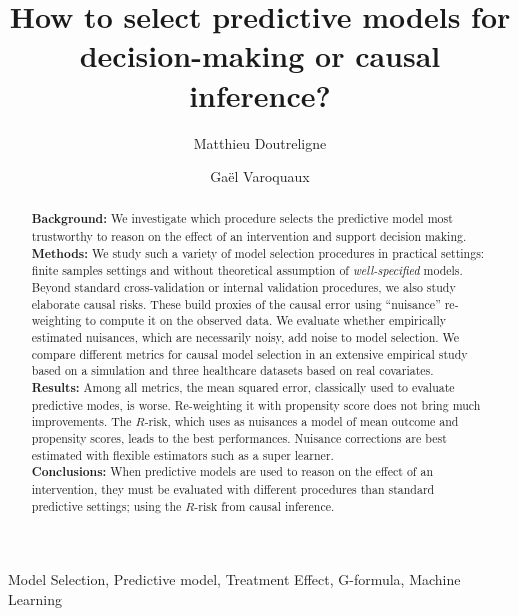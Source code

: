 \documentclass[a4paper,num-refs]{oup-contemporary}%
\title{How to select predictive models for decision-making or causal inference?}
\author[1,\authfn{1}]{Matthieu Doutreligne}
\author[2]{Gaël Varoquaux}
\affil[1]{Soda, Inria Saclay, France}
\affil[2]{Mission Data, Haute Autorité de Santé, France}
\newcommand{\eg}{\emph{e.g.}}
\begin{document}
\begin{frontmatter}
    \maketitle
    \begin{abstract}
        \textbf{Background:}
        We investigate which procedure selects the predictive model most
        trustworthy to reason on the effect of an intervention and support
        decision making.\\
        \textbf{Methods:}
        We study such a variety of model selection procedures in practical settings:
        finite samples settings and without theoretical assumption of
        \emph{well-specified} models. Beyond standard cross-validation or
        internal validation procedures, we also study elaborate causal risks.
        These build proxies of the causal error using ``nuisance''
        re-weighting to compute it on the observed data. We evaluate whether
        empirically estimated nuisances, which are necessarily noisy,
        add noise to model selection. We compare different metrics for
        causal model selection in an extensive empirical
        study based on a simulation and three healthcare datasets
        based on real covariates. \\
        \textbf{Results:} Among all metrics, the mean squared error,
        classically used to evaluate predictive modes,
        is worse. Re-weighting it with propensity score
        does not bring much improvements. The
        $R\text{-risk}$, which uses as nuisances a model of
        mean outcome and propensity scores, leads to the best performances.
        Nuisance corrections are best estimated with flexible estimators such
        as a super learner.
        \\
        \textbf{Conclusions:} When predictive models are used to
        reason on the effect of an intervention, they must be evaluated
        with different procedures than standard predictive
        settings; using the $R\text{-risk}$ from causal inference.
    \end{abstract}

    \begin{keywords}
        Model Selection, Predictive model, Treatment Effect, G-formula, Machine Learning
    \end{keywords}

\end{frontmatter}
\end{document}
